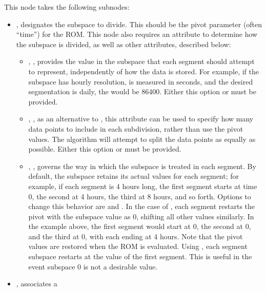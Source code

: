 {    This node takes the following subnodes:
    \begin{itemize}
      \item {},  designates the subspace to divide. This
        should be the pivot parameter (often ``time'') for the ROM. This node also requires an attribute
        to determine how the subspace is divided, as well as other attributes, described below:
        \begin{itemize}
          \item {}, , provides the value in the subspace
            that each segment should attempt to represent, independently of how the data is stored. For
            example, if the subspace has hourly resolution, is measured in seconds, and the desired
            segmentation is daily, the  would be 86400.
            Either this option or  must be provided.
          \item {}, , as an alternative to
            , this attribute can be used to specify how many data points to include in
            each subdivision, rather than use the pivot values. The algorithm will attempt to split the data
            points as equally as possible.
            Either this option or  must be provided.
          \item {}, , governs the way in which the subspace is
            treated in each segment. By default, the subspace retains its actual values for each segment; for
            example, if each segment is 4 hours long, the first segment starts at time 0, the second at 4
            hours, the third at 8 hours, and so forth. Options to change this behavior are 
            and . In the case of , each segment restarts the pivot with the
            subspace value as 0, shifting all other values similarly. In the example above, the first segment
            would start at 0, the second at 0, and the third at 0, with each ending at 4 hours. Note that the
            pivot values are restored when the ROM is evaluated. Using , each segment
            subspace restarts at the value of the first segment. This is useful in the event subspace 0 is not
            a desirable value.
        \end{itemize}
      \item {},  associates a 

\end{itemize}}
